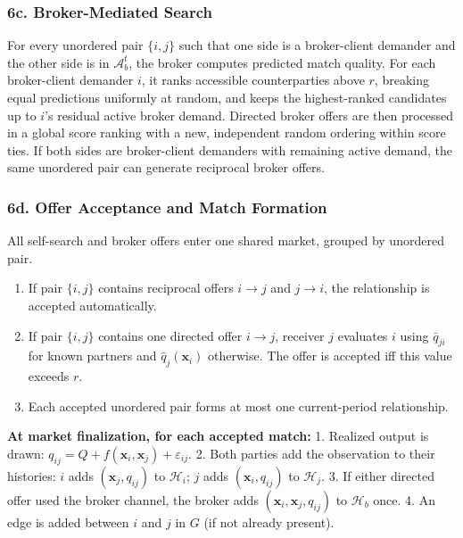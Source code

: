 \documentclass[11pt]{article}
\providecommand{\tightlist}{%
  \setlength{\itemsep}{0pt}\setlength{\parskip}{0pt}}
\begin{document}
\subsubsection{6c. Broker-Mediated Search}\label{c.-broker-mediated-search}

For every unordered pair \(\{i,j\}\) such that one side is a broker-client demander and the other side is in \(\mathcal{A}_b^t\), the broker computes predicted match quality. For each broker-client demander \(i\), it ranks accessible counterparties above \(r\), breaking equal predictions uniformly at random, and keeps the highest-ranked candidates up to \(i\)'s residual active broker demand. Directed broker offers are then processed in a global score ranking with a new, independent random ordering within score ties. If both sides are broker-client demanders with remaining active demand, the same unordered pair can generate reciprocal broker offers.

\subsubsection{6d. Offer Acceptance and Match Formation}\label{d.-offer-acceptance-and-match-formation}

All self-search and broker offers enter one shared market, grouped by unordered pair.

\begin{enumerate}
\def\labelenumi{\arabic{enumi}.}
\tightlist
\item If pair \(\{i,j\}\) contains reciprocal offers \(i \to j\) and \(j \to i\), the relationship is accepted automatically.
\item If pair \(\{i,j\}\) contains one directed offer \(i \to j\), receiver \(j\) evaluates \(i\) using \(\bar{q}_{ji}\) for known partners and \(\hat{q}_j(\mathbf{x}_i)\) otherwise. The offer is accepted iff this value exceeds \(r\).
\item Each accepted unordered pair forms at most one current-period relationship.
\end{enumerate}

\textbf{At market finalization, for each accepted match:} 1. Realized output is drawn: \(q_{ij} = Q + f(\mathbf{x}_i, \mathbf{x}_j) + \varepsilon_{ij}\). 2. Both parties add the observation to their histories: \(i\) adds \((\mathbf{x}_j, q_{ij})\) to \(\mathcal{H}_{i}\); \(j\) adds \((\mathbf{x}_i, q_{ij})\) to \(\mathcal{H}_{j}\). 3. If either directed offer used the broker channel, the broker adds \((\mathbf{x}_i, \mathbf{x}_j, q_{ij})\) to \(\mathcal{H}_b\) once. 4. An edge is added between \(i\) and \(j\) in \(G\) (if not already present).
\end{document}
